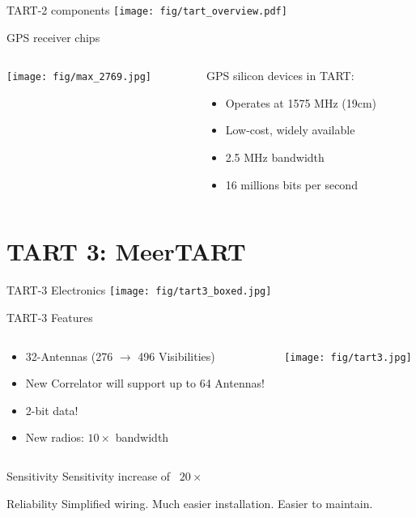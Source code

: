 \documentclass[ignorenonframetext]{beamer}
\begin{document}
 
\begin{frame}{TART-2 components}
  \texttt{[image: fig/tart\_overview.pdf]}
\end{frame}



\begin{frame}{GPS receiver chips}
 \begin{columns}
  \begin{column}{0.5\linewidth}
    \texttt{[image: fig/max\_2769.jpg]}
  \end{column}
  \begin{column}{0.4\linewidth}
  GPS silicon devices in TART:
\begin{itemize}
 \item Operates at 1575 MHz (19cm)
 \item Low-cost, widely available
 \item 2.5 MHz bandwidth
 \item 16 millions bits per second
\end{itemize}
  \end{column}
  \end{columns}
\end{frame}



\section{TART 3: MeerTART\texttrademark}

\frame{\tableofcontents[currentsection]}


\begin{frame}{TART-3 Electronics}
 \texttt{[image: fig/tart3\_boxed.jpg]}
\end{frame}

\begin{frame}{TART-3 Features}
 \begin{columns}
  \begin{column}{0.4\linewidth}
    \begin{itemize}
    \item 32-Antennas (276 $\rightarrow$ 496 Visibilities)
    \item New Correlator will support up to 64 Antennas!
    \item 2-bit data!
    \item New radios: $10 \times$ bandwidth
    \end{itemize}
  \end{column}
  \begin{column}{0.6\linewidth}
    \texttt{[image: fig/tart3.jpg]}
  \end{column}
\end{columns}
\pause
    \begin{block}{Sensitivity}
Sensitivity increase of ~$20 \times$
    \end{block}
    \begin{block}{Reliability}
Simplified wiring. Much easier installation. Easier to maintain.
    \end{block}
\end{frame}
\end{document}
